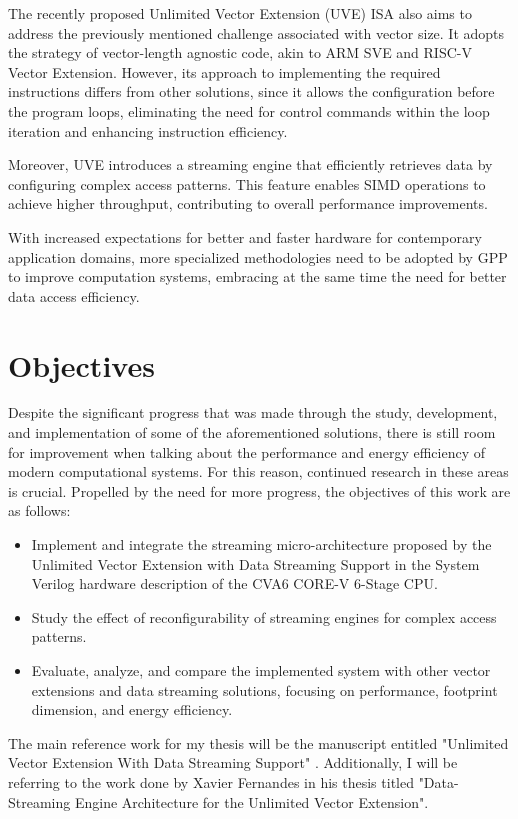 The recently proposed Unlimited Vector Extension (UVE) \cite{uve-paper} \acrfull{ISA} also aims to address the previously mentioned challenge associated with vector size. It adopts the strategy of vector-length agnostic code, akin to ARM SVE and RISC-V Vector Extension. However, its approach to implementing the required instructions differs from other solutions, since it allows the configuration before the program loops, eliminating the need for control commands within the loop iteration and enhancing instruction efficiency.

Moreover, UVE introduces a streaming engine that efficiently retrieves data by configuring complex access patterns. This feature enables \acrshort{SIMD} operations to achieve higher throughput, contributing to overall performance improvements.

With increased expectations for better and faster hardware for contemporary application domains, more specialized methodologies need to be adopted by \acrfull{GPP} to improve computation systems, embracing at the same time the need for better data access efficiency.


\section{Objectives}

Despite the significant progress that was made through the study, development, and implementation of some of the aforementioned solutions, there is still room for improvement when talking about the performance and energy efficiency of modern computational systems. For this reason, continued research in these areas is crucial. 
Propelled by the need for more progress, the objectives of this work are as follows:
\begin{itemize}
    \item Implement and integrate the streaming micro-architecture proposed by the Unlimited Vector Extension with Data Streaming Support in the System Verilog hardware description of the CVA6 CORE-V 6-Stage CPU. 
    \item Study the effect of reconfigurability of streaming engines for complex access patterns.
    \item Evaluate, analyze, and compare the implemented system with other vector extensions and data streaming solutions, focusing on performance, footprint dimension, and energy efficiency.
\end{itemize}

The main reference work for my thesis will be the manuscript entitled "Unlimited Vector Extension With Data Streaming Support" \cite{uve-paper}. Additionally, I will be referring to the work done by Xavier Fernandes in his thesis titled "Data-Streaming Engine Architecture for the Unlimited Vector Extension".

